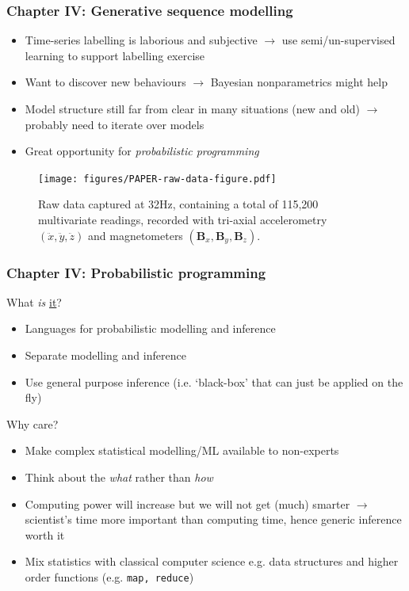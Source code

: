 \documentclass[aspectratio=169]{beamer}
\begin{document}
\begin{frame}
    \frametitle{Chapter IV: Generative sequence modelling}
    \begin{itemize}
        \item Time-series labelling is laborious and subjective $\rightarrow$ use semi/un-supervised learning to support labelling exercise
        \item Want to discover new behaviours $\rightarrow$ Bayesian nonparametrics might help 
        \item Model structure still far from clear in many situations (new and old) $\rightarrow$ probably need to iterate over models 
        \item Great opportunity for \emph{probabilistic programming}
    \end{itemize}
    \begin{figure}
        \centering
        \texttt{[image: figures/PAPER-raw-data-figure.pdf]}
        \vspace{-0.5em}
        \caption{Raw data captured at 32Hz, containing a total of 115,200 multivariate readings, recorded with tri-axial
        accelerometry $(\ddot{x},\ddot{y},\ddot{z})$ and magnetometers $(\mathbf{B}_x,\mathbf{B}_y,\mathbf{B}_z)$.}
    \end{figure}


\end{frame}



\begin{frame}
    \frametitle{Chapter IV: Probabilistic programming}
    What \emph{is} \underline{it}?
    \begin{itemize}
        \item Languages for probabilistic modelling and inference 
        \item Separate modelling and inference
        \item Use general purpose inference (i.e. `black-box' that can just be applied on the fly)
    \end{itemize}
    Why care?
    \begin{itemize}
        \item Make complex statistical modelling/ML available to non-experts
        \item Think about the \emph{what} rather than \emph{how}
        \item Computing power will increase but we will not get (much) smarter $\rightarrow$ scientist's time more important than computing time, hence generic inference worth it
        \item Mix statistics with classical computer science e.g. data structures and  higher order functions
            (e.g. \texttt{map, reduce})
    \end{itemize}
\end{frame}
\end{document}
